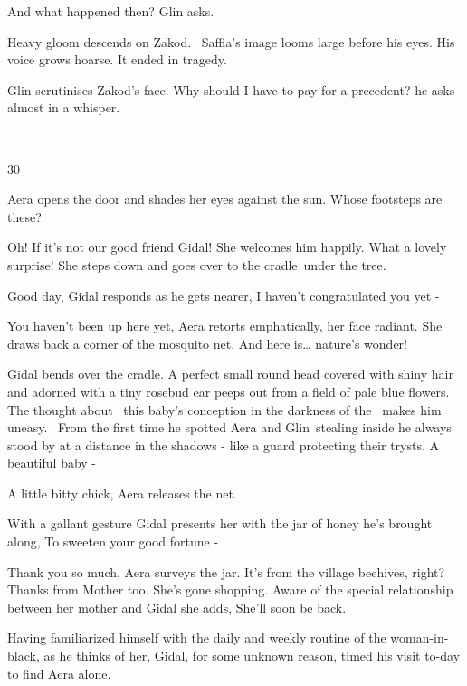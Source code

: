 \documentclass[letterpaper]{article}
\begin{document}
{\textquotedbl}And what happened then?{\textquotedbl} Glin asks. 

Heavy gloom descends on Zakod. \ Saffia's image looms large before his eyes. His voice grows hoarse. {\textquotedbl}It
ended in tragedy.{\textquotedbl} 

Glin scrutinises Zakod's face. {\textquotedbl}Why should{ }I have to pay for a
precedent?{\textquotedbl} he asks almost in a whisper.

~

30~~ 

Aera opens the door and shades her eyes against the sun. Whose footsteps are these? 

{\textquotedbl}Oh! If it's not our good friend Gidal!{\textquotedbl} She welcomes him happily. {\textquotedbl}What a
lovely surprise!{\textquotedbl} She steps down and goes over to the
cradle~under{ }the tree. 

{\textquotedbl}Good day,{\textquotedbl} Gidal responds as he gets nearer, {\textquotedbl}I haven't congratulated you yet
-{\textquotedbl} 

{\textquotedbl}You haven't been up here yet,{\textquotedbl} Aera retorts emphatically, her face radiant. She draws back
a corner of the mosquito net. {\textquotedbl}And here is{\dots} nature's wonder!{\textquotedbl} ~

Gidal bends over the cradle. A perfect small round head covered with shiny hair and adorned with a tiny rosebud ear
peeps out from a field of pale blue flowers. The thought about \ this baby's conception in the darkness of the \ makes
him uneasy. ~From the first time he spotted Aera and Glin~stealing inside he always stood by at a distance in the
shadows - like a guard protecting their trysts. {\textquotedbl}A beautiful baby -{\textquotedbl} 

{\textquotedbl}A little bitty chick,{\textquotedbl} Aera releases the net. 

With a gallant gesture Gidal presents her with the jar of honey he's brought along, {\textquotedbl}To sweeten your good
fortune -{\textquotedbl} 

{\textquotedbl}Thank you so much,{\textquotedbl} Aera surveys the jar. {\textquotedbl}It's from the village beehives,
right? Thanks from Mother too. She's gone shopping.{\textquotedbl} Aware of the special relationship between her mother
and Gidal she adds, {\textquotedbl}She'll soon be back.{\textquotedbl} 

Having familiarized himself with the daily and weekly routine of the woman-in-black, as he thinks of her, Gidal, for
some unknown reason, timed his visit to-day to find Aera alone.
\end{document}
